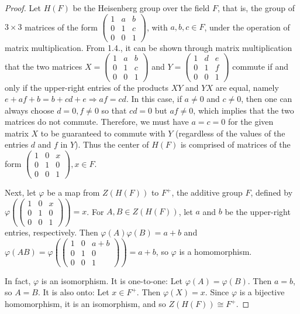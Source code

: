 \documentclass{article}
\begin{document}
\begin{proof}
  Let $H(F)$ be the Heisenberg group over the field $F$, that is, the group of $3 \times 3$ matrices of the form $\begin{pmatrix}1 & a & b \\ 0 & 1 & c \\ 0 & 0 & 1\end{pmatrix}$, with $a, b, c \in F$, under the operation of matrix multiplication. From 1.4., it can be shown through matrix multiplication that the two matrices $X = \begin{pmatrix}1 & a & b \\ 0 & 1 & c \\ 0 & 0 & 1\end{pmatrix}$ and $Y = \begin{pmatrix}1 & d & e \\ 0 & 1 & f \\ 0 & 0 & 1\end{pmatrix}$ commute if and only if the upper-right entries of the products $XY$ and $YX$ are equal, namely $e + af + b = b + cd + e \Rightarrow af = cd$. In this case, if $a \neq 0$ and $c \neq 0$, then one can always choose $d = 0, f \neq 0$ so that $cd = 0$ but $af \neq 0$, which implies that the two matrices do not commute. Therefore, we must have $a = c = 0$ for the given matrix $X$ to be guaranteed to commute with $Y$ (regardless of the values of the entries $d$ and $f$ in $Y$). Thus the center of $H(F)$ is comprised of matrices of the form $\begin{pmatrix}1 & 0 & x \\ 0 & 1 & 0 \\ 0 & 0 & 1\end{pmatrix}, x \in F$.

  Next, let $\varphi$ be a map from $Z(H(F))$ to $F^+$, the additive group $F$, defined by $\varphi(\begin{pmatrix}1 & 0 & x \\ 0 & 1 & 0 \\ 0 & 0 & 1\end{pmatrix}) = x$. For $A, B \in Z(H(F))$, let $a$ and $b$ be the upper-right entries, respectively. Then $\varphi(A)\varphi(B) = a + b$ and $\varphi(AB) = \varphi(\begin{pmatrix}1 & 0 & a + b \\ 0 & 1 & 0 \\ 0 & 0 & 1\end{pmatrix}) = a + b$, so $\varphi$ is a homomorphism.

  In fact, $\varphi$ is an isomorphism. It is one-to-one: Let $\varphi(A) = \varphi(B)$. Then $a = b$, so $A = B$. It is also onto: Let $x \in F^+$. Then $\varphi(X) = x$. Since $\varphi$ is a bijective homomorphism, it is an isomorphism, and so $Z(H(F)) \cong F^+$.
\end{proof}
\end{document}
